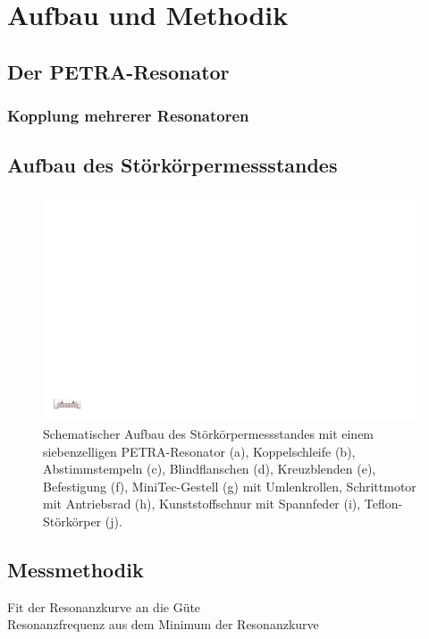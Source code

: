 \chapter{Aufbau und Methodik}
\label{sec:aufbau_und_methodik}


\section{Der PETRA-Resonator}


\subsection{Kopplung mehrerer Resonatoren}


\section{Aufbau des Störkörpermessstandes}
\begin{figure}
	\centering
	\includegraphics[width=1.0\textheight]{./figs/cavity/messaufbau.pdf}
	\caption{Schematischer Aufbau des Störkörpermessstandes mit einem siebenzelligen PETRA-Resonator (a),  Koppelschleife (b), Abstimmstempeln (c), Blindflanschen (d), Kreuzblenden (e), Befestigung (f), MiniTec-Gestell (g) mit Umlenkrollen, Schrittmotor mit Antriebsrad (h), Kunststoffschnur mit Spannfeder (i), Teflon-Störkörper (j).}
\end{figure}


\section{Messmethodik}
Fit der Resonanzkurve an die Güte\\
Resonanzfrequenz aus dem Minimum der Resonanzkurve
